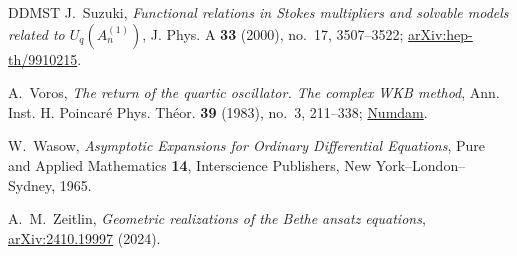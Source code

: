 \documentclass[11pt,leqno]{amsart}
\numberwithin{equation}{section}
\theoremstyle{plain}
\theoremstyle{definition}
\theoremstyle{plain}
\theoremstyle{definition}
\theoremstyle{remark}
\begin{document}
\begin{thebibliography}{DDMST}
J.~Suzuki,
\emph{Functional relations in Stokes multipliers and solvable models related to $U_q(A_n^{(1)})$},
J. Phys. A \textbf{33} (2000), no.~17, 3507--3522; \href{https://arxiv.org/abs/hep-th/9910215}{arXiv:hep-th/9910215}.

A.~Voros,
\emph{The return of the quartic oscillator. The complex WKB method},
Ann. Inst. H. Poincar\'e Phys. Th\'eor. \textbf{39} (1983), no.~3, 211--338; \href{https://www.numdam.org/item/AIHPA_1983__39_3_211_0/}{Numdam}.

W.~Wasow,
\emph{Asymptotic Expansions for Ordinary Differential Equations},
Pure and Applied Mathematics \textbf{14}, Interscience Publishers, New York--London--Sydney, 1965.

A.~M.~Zeitlin,
\emph{Geometric realizations of the Bethe ansatz equations},
\href{https://arxiv.org/abs/2410.19997}{arXiv:2410.19997} (2024).

\end{thebibliography}
\end{document}
